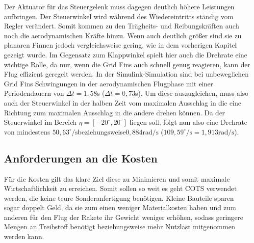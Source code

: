 Der Aktuator für das Steuergelenk muss dagegen deutlich höhere Leistungen aufbringen. Der Steuerwinkel wird während des Wiedereintritts ständig vom Regler verändert. Somit kommen zu den Trägheits- und Reibungskräften auch noch die aerodynamischen Kräfte hinzu. Wenn auch deutlich größer sind sie zu planaren Finnen jedoch vergleichsweise gering, wie in dem vorherigen Kapitel gezeigt wurde. Im Gegensatz zum Klappwinkel spielt hier auch die Drehrate eine wichtige Rolle, da nur, wenn die Grid Fins auch schnell genug reagieren, kann der Flug effizient geregelt werden. In der Simulink-Simulation sind bei unbeweglichen Grid Fins Schwingungen in der aerodynamischen Flugphase mit einer Periodendauern von $\Delta t=1,58$s ($\Delta t=0,73$s). Um diese auszugleichen, muss also auch der Steuerwinkel in der halben Zeit vom maximalen Ausschlag in die eine Richtung zum maximalen Ausschlag in die andere drehen können. Da der Steuerwinkel im Bereich $\eta = [-20^\circ,20^\circ]$ liegen soll, folgt nun also eine Drehrate von mindestens $50,63^\circ/\mathrm{s}$beziehungsweise$0,884\mathrm{rad/s}$ ($109,59^\circ/\mathrm{s}=1,913\mathrm{rad/s}$).
\subsection{Anforderungen an die Kosten}
Für die Kosten gilt das klare Ziel diese zu Minimieren und somit maximale Wirtschaftlichkeit zu erreichen. Somit sollen so weit es geht COTS verwendet werden, die keine teure Sonderanfertigung benötigen. Kleine Bauteile sparen sogar doppelt Geld, da sie zum einen weniger Materialkosten haben und zum anderen für den Flug der Rakete ihr Gewicht weniger erhöhen, sodass geringere Mengen an Treibstoff benötigt beziehungsweise mehr Nutzlast mitgenommen werden kann.
